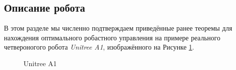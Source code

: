 \subsection{Описание робота}\label{sec:ch3/sect3/sub2}
В этом разделе мы численно подтверждаем приведённые ранее теоремы для нахождения оптимального робастного управления на примере реального четвероногого робота \textit{Unitree A1}, изображённого на Рисунке \cref{fig:unitree}.
\begin{figure}[ht]
	\caption{Unitree A1}\label{fig:unitree}
\end{figure} 

